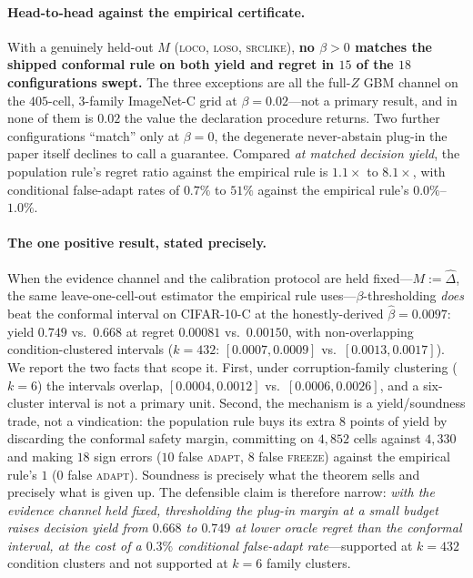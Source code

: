 \paragraph{Head-to-head against the empirical certificate.} With a genuinely held-out $M$
(\textsc{loco}, \textsc{loso}, \textsc{srclike}), \textbf{no $\beta>0$ matches the shipped conformal
rule on both yield and regret in $15$ of the $18$ configurations swept.} The three exceptions are
all the full-$Z$ GBM channel on the $405$-cell, $3$-family ImageNet-C grid at $\beta=0.02$---not a
primary result, and in none of them is $0.02$ the value the declaration procedure returns. Two
further configurations ``match'' only at $\beta=0$, the degenerate never-abstain plug-in the paper
itself declines to call a guarantee. Compared \emph{at matched decision yield}, the population
rule's regret ratio against the empirical rule is $1.1\times$ to $8.1\times$, with conditional
false-adapt rates of $0.7\%$ to $51\%$ against the empirical rule's $0.0\%$--$1.0\%$.

\paragraph{The one positive result, stated precisely.} When the evidence channel and the calibration
protocol are held fixed---$M:=\widehat\Delta$, the same leave-one-cell-out estimator the empirical
rule uses---$\beta$-thresholding \emph{does} beat the conformal interval on CIFAR-10-C at the
honestly-derived $\widehat\beta=0.0097$: yield $0.749$ vs.\ $0.668$ at regret $0.00081$ vs.\
$0.00150$, with non-overlapping condition-clustered intervals ($k{=}432$: $[0.0007,0.0009]$ vs.\
$[0.0013,0.0017]$). We report the two facts that scope it. First, under corruption-family
clustering ($k{=}6$) the intervals overlap, $[0.0004,0.0012]$ vs.\ $[0.0006,0.0026]$, and a
six-cluster interval is not a primary unit. Second, the mechanism is a yield/soundness trade, not a
vindication: the population rule buys its extra $8$ points of yield by discarding the conformal
safety margin, committing on $4{,}852$ cells against $4{,}330$ and making $18$ sign errors
($10$ false \textsc{adapt}, $8$ false \textsc{freeze}) against the empirical rule's $1$
($0$ false \textsc{adapt}). Soundness is precisely what the theorem sells and precisely what is
given up. The defensible claim is therefore narrow: \emph{with the evidence channel held fixed,
thresholding the plug-in margin at a small budget raises decision yield from $0.668$ to $0.749$ at
lower oracle regret than the conformal interval, at the cost of a $0.3\%$ conditional false-adapt
rate}---supported at $k{=}432$ condition clusters and not supported at $k{=}6$ family clusters.


